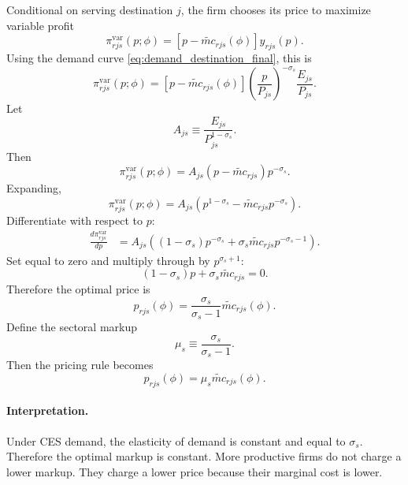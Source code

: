 \documentclass[11pt]{article}
\begin{document}
Conditional on serving destination \(j\), the firm chooses its price to maximize variable profit
\begin{equation}
\pi^{\mathrm{var}}_{rjs}(p;\phi)=\left[p-\widetilde{mc}_{rjs}(\phi)\right]y_{rjs}(p).
\end{equation}
Using the demand curve \eqref{eq:demand_destination_final}, this is
\begin{equation}
\pi^{\mathrm{var}}_{rjs}(p;\phi)=\left[p-\widetilde{mc}_{rjs}(\phi)\right]\left(\frac{p}{P_{js}}\right)^{-\sigma_s}\frac{E_{js}}{P_{js}}.
\end{equation}
Let
\begin{equation}
A_{js}\equiv \frac{E_{js}}{P_{js}^{1-\sigma_s}}.
\end{equation}
Then
\begin{equation}
\pi^{\mathrm{var}}_{rjs}(p;\phi)=A_{js}(p-\widetilde{mc}_{rjs})p^{-\sigma_s}.
\end{equation}
Expanding,
\begin{equation}
\pi^{\mathrm{var}}_{rjs}(p;\phi)=A_{js}\left(p^{1-\sigma_s}-\widetilde{mc}_{rjs}p^{-\sigma_s}\right).
\end{equation}
Differentiate with respect to \(p\):
\begin{align}
\frac{d\pi^{\mathrm{var}}_{rjs}}{dp}
&=A_{js}\left((1-\sigma_s)p^{-\sigma_s}+\sigma_s\widetilde{mc}_{rjs}p^{-\sigma_s-1}\right).
\end{align}
Set equal to zero and multiply through by \(p^{\sigma_s+1}\):
\begin{equation}
(1-\sigma_s)p+\sigma_s\widetilde{mc}_{rjs}=0.
\end{equation}
Therefore the optimal price is
\begin{equation}
p_{rjs}(\phi)=\frac{\sigma_s}{\sigma_s-1}\widetilde{mc}_{rjs}(\phi).
\label{eq:price_final}
\end{equation}
Define the sectoral markup
\begin{equation}
\mu_s\equiv\frac{\sigma_s}{\sigma_s-1}.
\end{equation}
Then the pricing rule becomes
\begin{equation}
p_{rjs}(\phi)=\mu_s\widetilde{mc}_{rjs}(\phi).
\end{equation}

\paragraph{Interpretation.}
Under CES demand, the elasticity of demand is constant and equal to \(\sigma_s\). Therefore the optimal markup is constant. More productive firms do not charge a lower markup. They charge a lower price because their marginal cost is lower.
\end{document}
